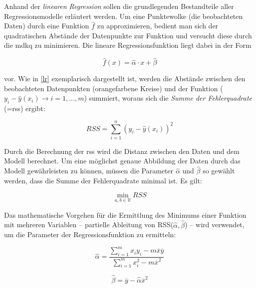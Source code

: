 Anhand der \textit{linearen Regression} sollen die grundlegenden Bestandteile aller Regressionsmodelle erläutert werden. Um eine Punktewolke (die beobachteten Daten) durch eine Funktion $\hat{f}$ zu approximieren, bedient man sich der quadratischen Abstände der Datenpunkte zur Funktion und versucht diese durch die \gls{mdkq} zu minimieren. Die lineare Regressionsfunktion liegt dabei in der Form 

\begin{equation}
	\hat{f}(x) = \hat{\alpha} \cdot x + \hat{\beta}
	\label{lrf}
\end{equation}

vor. Wie in \vref{lr} exemplarisch dargestellt ist, werden die Abstände zwischen den beobachteten Datenpunkten (orangefarbene Kreise) und der Funktion ($y_i -  \hat{y}(x_i) \rightarrow i= 1,...,m$) summiert, woraus sich die \textit{Summe der Fehlerquadrate} (=\gls{rss}) ergibt:

\begin{equation}
	RSS = \sum\limits_{i=1}^n (y_i - \hat{y}(x_i))^2
\end{equation}

Durch die Berechnung der \gls{rss} wird die Distanz zwischen den Daten und dem Modell berechnet. Um eine möglichst genaue Abbildung der Daten durch das Modell gewährleisten zu können, müssen die Parameter $\hat{\alpha}$ und $\hat{\beta}$ so gewählt werden, dass die Summe der Fehlerquadrate minimal ist. Es gilt:

\begin{equation}
	\min\limits_{a,b\in\mathbb{R}} RSS
\end{equation}

Das mathematische Vorgehen für die Ermittlung des Minimums einer Funktion mit mehreren Variablen -- partielle Ableitung von RSS($\hat{\alpha},\hat{\beta}$) -- wird verwendet, um die Parameter der Regressionsfunktion zu ermitteln:

\begin{equation}
	\hat{\alpha} = \frac{\sum\limits_{i=1}^m x_i y_i - m \overline{x} \overline{y}}{\sum\limits_{i=1}^m x^2_i - m \overline{x}^2}
\end{equation}

\begin{equation}
	\hat{\beta} = \overline{y} - \hat{\alpha} \overline{x}^2
\end{equation}

